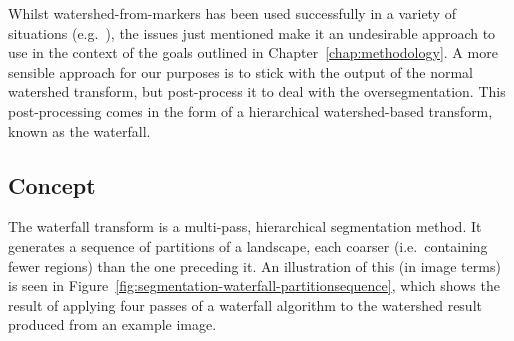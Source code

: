 Whilst watershed-from-markers has been used successfully in a variety of situations (e.g.~\cite{chae07,gonzalez07}), the issues just mentioned make it an undesirable approach to use in the context of the goals outlined in Chapter~\ref{chap:methodology}. A more sensible approach for our purposes is to stick with the output of the normal watershed transform, but post-process it to deal with the oversegmentation. This post-processing comes in the form of a hierarchical watershed-based transform, known as the waterfall.


\subsection{Concept}


The waterfall transform is a multi-pass, hierarchical segmentation method. It generates a sequence of partitions of a landscape, each coarser (i.e.~containing fewer regions) than the one preceding it. An illustration of this (in image terms) is seen in Figure~\ref{fig:segmentation-waterfall-partitionsequence}, which shows the result of applying four passes of a waterfall algorithm to the watershed result produced from an example image.

